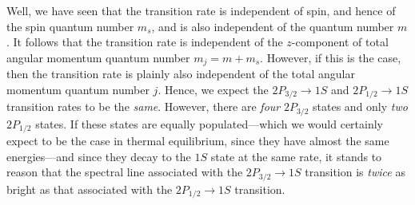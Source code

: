 Well, we have seen that the transition rate is independent of spin, and
hence of the spin quantum number $m_s$, and is
also independent of the quantum number $m$. It follows that the
transition rate is independent of the  $z$-component
of total angular momentum quantum number $m_j = m+m_s$. However,
if this is the case, then the transition rate is plainly also independent of
the total angular momentum quantum number $j$. Hence,
we expect the $2P_{3/2}\rightarrow 1S$ and $2P_{1/2}\rightarrow 1S$
transition rates to be the {\em same}. However, there are {\em four}\/ $2P_{3/2}$ states
and only {\em two}\/ $2P_{1/2}$ states. If these states are equally
populated---which we would certainly expect to be the case in thermal
equilibrium, since they have almost the same energies---and since they decay
to the $1S$ state at the same rate, it stands to reason that the
spectral line associated with the $2P_{3/2}\rightarrow 1S$ transition
is {\em twice}\/  as bright as that associated with the $2P_{1/2}\rightarrow 1S$ transition.

